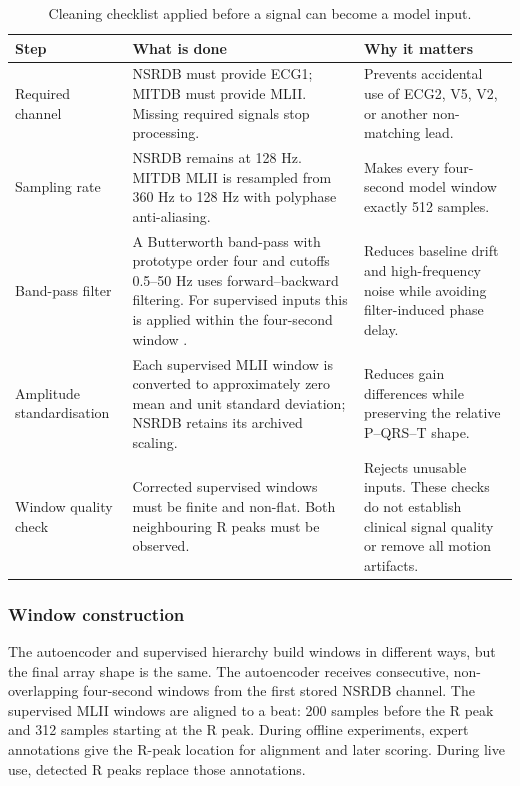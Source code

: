 \begin{table}[H]
\centering
\small
\caption{Cleaning checklist applied before a signal can become a model input.}
\label{tab:data-cleaning-checklist}
\begin{tabular}{>{\raggedright\arraybackslash}p{2.6cm}>{\raggedright\arraybackslash}p{5.0cm}>{\raggedright\arraybackslash}p{4.3cm}}
\toprule
Step & What is done & Why it matters\\
\midrule
Required channel & NSRDB must provide ECG1; MITDB must provide MLII. Missing
required signals stop processing. & Prevents accidental use of ECG2, V5, V2, or
another non-matching lead.\\
\addlinespace
Sampling rate & NSRDB remains at 128 Hz. MITDB MLII is resampled from 360 Hz to
128 Hz with polyphase anti-aliasing. & Makes every four-second model window
exactly 512 samples.\\
\addlinespace
Band-pass filter & A Butterworth band-pass with prototype order four
and cutoffs 0.5--50 Hz uses forward--backward filtering. For supervised inputs
this is applied within the four-second window \cite{butterworth1930filter,virtanen2020scipy}. & Reduces baseline drift and high-frequency noise while avoiding filter-induced
phase delay.\\
\addlinespace
Amplitude standardisation & Each supervised MLII window is converted to approximately zero mean
and unit standard deviation; NSRDB retains its archived scaling. & Reduces gain differences while preserving the
relative P--QRS--T shape.\\
\addlinespace
Window quality check & Corrected supervised windows must be finite and
non-flat. Both neighbouring R peaks must be observed. & Rejects unusable
inputs. These checks do not establish clinical signal quality or remove all
motion artifacts.\\
\bottomrule
\end{tabular}
\end{table}

\subsubsection{Window construction}

The autoencoder and supervised hierarchy build windows in different ways, but
the final array shape is the same. The autoencoder receives consecutive,
non-overlapping four-second windows from the first stored NSRDB channel. The
supervised MLII windows are aligned to a beat: 200 samples before the R peak
and 312 samples starting at the R peak. During offline experiments, expert annotations give
the R-peak location for alignment and later scoring. During live use, detected
R peaks replace those annotations.

